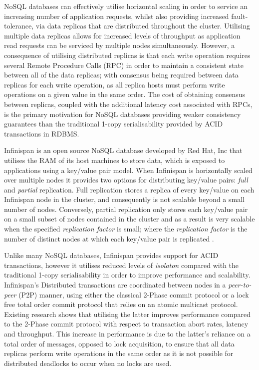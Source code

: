     NoSQL databases can effectively utilise horizontal scaling in order to service an increasing number of application requests, whilst also providing increased fault-tolerance, via data replicas that are distributed throughout the cluster.  Utilising multiple data replicas allows for increased levels of throughput as application read requests can be serviced by multiple nodes simultaneously.  However, a consequence of utilising distributed replicas is that each write operation requires several Remote Procedure Calls (RPC) in order to maintain a consistent state between all of the data replicas; with consensus being required between data replicas for each write operation, as all replica hosts must perform write operations  on a given value in the same order.  The cost of obtaining consensus between replicas, coupled with the additional latency cost associated with RPCs, is the primary motivation for NoSQL databases providing weaker consistency guarantees than the traditional 1-copy serialisability provided by ACID transactions in RDBMS.  
    
    Infinispan \citep{Infinispan, marchioni2012infinispan} is an open source NoSQL database developed by Red Hat, Inc \citep{RedHat} that utilises the RAM of its host machines to store data, which is exposed to applications using a key/value pair model.  When Infinispan is horizontally scaled over multiple nodes it provides two options for distributing key/value pairs: \emph{full} and \emph{partial} replication.  Full replication stores a replica of every key/value on each Infinispan node in the cluster, and consequently is not scalable beyond a small number of nodes.  Conversely, partial replication only stores each key/value pair on a small subset of nodes contained in the cluster and as a result is very scalable when the specified \emph{replication factor} is small; where the \emph{replication factor} is the number of distinct nodes at which each key/value pair is replicated \citep{Schiper:2010:PGP:1915085.1916444}.  
    
    Unlike many NoSQL databases, Infinispan provides support for ACID transactions, however it utilises reduced levels of \emph{isolaton} compared with the traditional 1-copy serialisability in order to improve performance and scalability.  Infinispan's Distributed transactions are coordinated between nodes in a \emph{peer-to-peer} (P2P) manner, using either the classical 2-Phase commit protocol or a lock free total order commit protocol that relies on an atomic multicast protocol.  Existing research \citep{Ruivo:2011:ETO:2120967.2121604} shows that utilising the latter improves performance compared to the 2-Phase commit protocol with respect to transaction abort rates, latency and throughput.  This increase in performance is due to the latter's reliance on a total order of messages, opposed to lock acquisition, to ensure that all data replicas perform write operations in the same order as it is not possible for distributed deadlocks to occur when no locks are used.  
    
